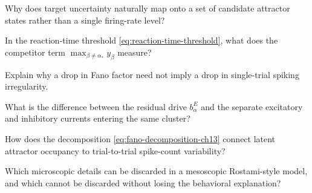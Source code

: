 \begin{conceptquestions}
  \item Why does target uncertainty naturally map onto a set of candidate attractor states rather than a single firing-rate level?

  \item In the reaction-time threshold \eqref{eq:reaction-time-threshold}, what does the competitor term $\max_{\beta\ne\alpha_*}y_{\beta}$ measure?

  \item Explain why a drop in Fano factor need not imply a drop in single-trial spiking irregularity.

  \item What is the difference between the residual drive $b_{\alpha}^{E}$ and the separate excitatory and inhibitory currents entering the same cluster?

  \item How does the decomposition \eqref{eq:fano-decomposition-ch13} connect latent attractor occupancy to trial-to-trial spike-count variability?

  \item Which microscopic details can be discarded in a mesoscopic Rostami-style model, and which cannot be discarded without losing the behavioral explanation?
\end{conceptquestions}
